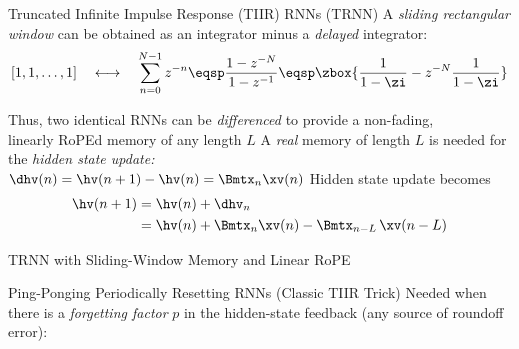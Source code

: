 \begin{slide}[\slideopts,toc={TIIR RNNs}]{Truncated Infinite Impulse Response (TIIR) RNNs (TRNN)}
  A \emph{sliding rectangular window} can be obtained as an integrator minus a \emph{delayed} integrator:
  \[
  [1,1,\ldots, 1] \quad\longleftrightarrow\quad \sum_{n=0}^{N-1} z^{-n} \eqsp \frac{1-z^{-N}}{1-z^{-1}} \eqsp \zbox{\frac{1}{1-\zi} - z^{-N}\frac{1}{1-\zi}}
  \]
  \begin{itemize}
    \mpitem Thus, two identical RNNs can be \emph{differenced} to provide a non-fading,\\
            linearly RoPEd memory of any length $L$
            \mpitem A \emph{real} memory of length $L$ is needed for the \emph{hidden state update:}\\
            $\dhv(n) = \hv(n+1)-\hv(n) = \Bmtx_n\xv(n)$
    \mpitem Hidden state update becomes
    \vspace{-1em}
    \begin{align*}
    \hv(n+1) &= \hv(n) + \dhv_n\\
             &= \hv(n) + \Bmtx_n\xv(n) - \Bmtx_{n-L}\, \xv(n-L)
    \end{align*}
    \vspace{-1em}
  \end{itemize}
\end{slide}

\begin{slide}[\slideopts,toc={TIIR Sliding Window}]{TRNN with Sliding-Window Memory and Linear RoPE}
\end{slide}

\begin{slide}[\slideopts,toc={TIIR Resets}]{Ping-Ponging Periodically Resetting RNNs (Classic TIIR Trick)}
  \vspace{-1em}
  Needed when there is a \emph{forgetting factor} $p$ in the hidden-state feedback (any source of roundoff error):
  \vspace{-2em}
\maybepause
{}
\end{slide}
